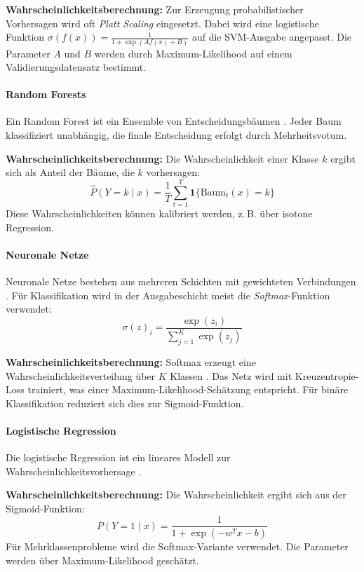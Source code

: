 \documentclass{article}
\begin{document}
\textbf{Wahrscheinlichkeitsberechnung:} Zur Erzeugung probabilistischer Vorhersagen wird oft \emph{Platt Scaling} eingesetzt. Dabei wird eine logistische Funktion \( \sigma(f(x)) = \frac{1}{1 + \exp(Af(x) + B)} \) auf die SVM-Ausgabe angepasst. Die Parameter \(A\) und \(B\) werden durch Maximum-Likelihood auf einem Validierungsdatensatz bestimmt\cite{Lin2007}.

\paragraph{Random Forests}
Ein Random Forest ist ein Ensemble von Entscheidungsbäumen \cite{Breiman2001}. Jeder Baum klassifiziert unabhängig, die finale Entscheidung erfolgt durch Mehrheitsvotum.

\textbf{Wahrscheinlichkeitsberechnung:} Die Wahrscheinlichkeit einer Klasse \(k\) ergibt sich als Anteil der Bäume, die \(k\) vorhersagen: 
\[ \hat{P}(Y=k \mid x) = \frac{1}{T} \sum_{t=1}^T \mathbf{1}\{ \text{Baum}_t(x) = k \} \]
Diese Wahrscheinlichkeiten können kalibriert werden, z.\,B. über isotone Regression.

\paragraph{Neuronale Netze}
Neuronale Netze bestehen aus mehreren Schichten mit gewichteten Verbindungen \cite{LeCun2015}. Für Klassifikation wird in der Ausgabeschicht meist die \emph{Softmax}-Funktion verwendet:
\[ \sigma(z)_i = \frac{\exp(z_i)}{\sum_{j=1}^K \exp(z_j)} \]

\textbf{Wahrscheinlichkeitsberechnung:} Softmax erzeugt eine Wahrscheinlichkeitsverteilung über \(K\) Klassen \cite{Bridle1990}. Das Netz wird mit Kreuzentropie-Loss trainiert, was einer Maximum-Likelihood-Schätzung entspricht. Für binäre Klassifikation reduziert sich dies zur Sigmoid-Funktion.

\paragraph{Logistische Regression}
Die logistische Regression ist ein lineares Modell zur Wahrscheinlichkeitsvorhersage \cite{Cox1958}. 

\textbf{Wahrscheinlichkeitsberechnung:} Die Wahrscheinlichkeit ergibt sich aus der Sigmoid-Funktion:
\[ P(Y=1 \mid x) = \frac{1}{1 + \exp(-w^T x - b)} \]
Für Mehrklassenprobleme wird die Softmax-Variante verwendet. Die Parameter werden über Maximum-Likelihood geschätzt.
\end{document}
